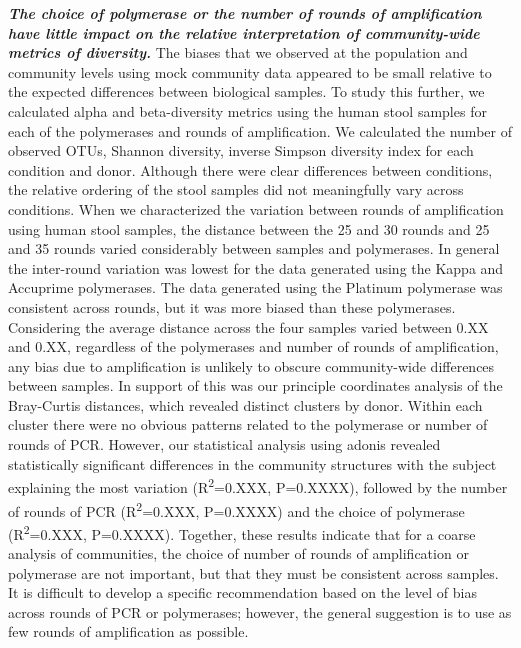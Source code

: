 \documentclass[11pt,]{article}
\begin{document}
\textbf{\emph{The choice of polymerase or the number of rounds of
amplification have little impact on the relative interpretation of
community-wide metrics of diversity.}} The biases that we observed at
the population and community levels using mock community data appeared
to be small relative to the expected differences between biological
samples. To study this further, we calculated alpha and beta-diversity
metrics using the human stool samples for each of the polymerases and
rounds of amplification. We calculated the number of observed OTUs,
Shannon diversity, inverse Simpson diversity index for each condition
and donor. Although there were clear differences between conditions, the
relative ordering of the stool samples did not meaningfully vary across
conditions. When we characterized the variation between rounds of
amplification using human stool samples, the distance between the 25 and
30 rounds and 25 and 35 rounds varied considerably between samples and
polymerases. In general the inter-round variation was lowest for the
data generated using the Kappa and Accuprime polymerases. The data
generated using the Platinum polymerase was consistent across rounds,
but it was more biased than these polymerases. Considering the average
distance across the four samples varied between 0.XX and 0.XX,
regardless of the polymerases and number of rounds of amplification, any
bias due to amplification is unlikely to obscure community-wide
differences between samples. In support of this was our principle
coordinates analysis of the Bray-Curtis distances, which revealed
distinct clusters by donor. Within each cluster there were no obvious
patterns related to the polymerase or number of rounds of PCR. However,
our statistical analysis using adonis revealed statistically significant
differences in the community structures with the subject explaining the
most variation (R\textsuperscript{2}=0.XXX, P=0.XXXX), followed by the
number of rounds of PCR (R\textsuperscript{2}=0.XXX, P=0.XXXX) and the
choice of polymerase (R\textsuperscript{2}=0.XXX, P=0.XXXX). Together,
these results indicate that for a coarse analysis of communities, the
choice of number of rounds of amplification or polymerase are not
important, but that they must be consistent across samples. It is
difficult to develop a specific recommendation based on the level of
bias across rounds of PCR or polymerases; however, the general
suggestion is to use as few rounds of amplification as possible.
\end{document}

